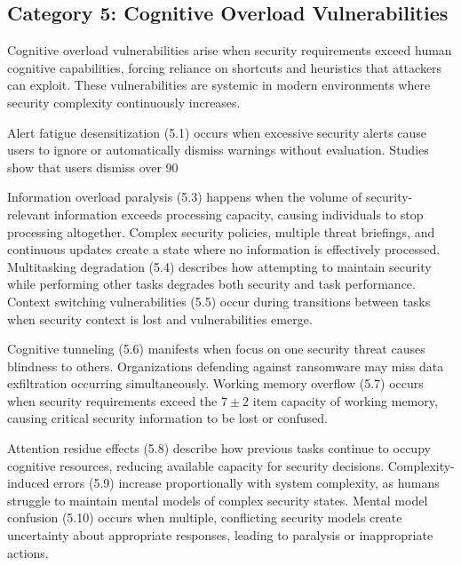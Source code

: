 \documentclass[manuscript,screen,review]{acmart}
\begin{document}
\subsection{Category 5: Cognitive Overload Vulnerabilities}

Cognitive overload vulnerabilities arise when security requirements exceed human cognitive capabilities, forcing reliance on shortcuts and heuristics that attackers can exploit. These vulnerabilities are systemic in modern environments where security complexity continuously increases.

Alert fatigue desensitization (5.1) occurs when excessive security alerts cause users to ignore or automatically dismiss warnings without evaluation. Studies show that users dismiss over 90%

Information overload paralysis (5.3) happens when the volume of security-relevant information exceeds processing capacity, causing individuals to stop processing altogether. Complex security policies, multiple threat briefings, and continuous updates create a state where no information is effectively processed. Multitasking degradation (5.4) describes how attempting to maintain security while performing other tasks degrades both security and task performance. Context switching vulnerabilities (5.5) occur during transitions between tasks when security context is lost and vulnerabilities emerge.

Cognitive tunneling (5.6) manifests when focus on one security threat causes blindness to others. Organizations defending against ransomware may miss data exfiltration occurring simultaneously. Working memory overflow (5.7) occurs when security requirements exceed the $7\pm2$ item capacity of working memory, causing critical security information to be lost or confused.

Attention residue effects (5.8) describe how previous tasks continue to occupy cognitive resources, reducing available capacity for security decisions. Complexity-induced errors (5.9) increase proportionally with system complexity, as humans struggle to maintain mental models of complex security states. Mental model confusion (5.10) occurs when multiple, conflicting security models create uncertainty about appropriate responses, leading to paralysis or inappropriate actions.
\end{document}
